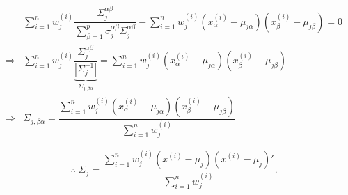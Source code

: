 \documentclass[11pt, a4paper]{article}
\begin{document}
\begin{align*}
&\sum_{i=1}^{n} w_j^{(i)} \dfrac{\Sigma_j^{\alpha\beta}}{\sum \limits_{\beta = 1}^{p} \sigma_j^{\alpha \beta}\Sigma_j^{\alpha \beta}} - \sum_{i=1}^{n} w_j^{(i)} \left(x_\alpha^{(i)}-\mu_{j\alpha}\right) \left(x_\beta^{(i)}-\mu_{j\beta}\right) = 0 \\[0.5em]
\Rightarrow &\sum_{i=1}^{n} w_j^{(i)} \underbrace{\dfrac{\Sigma_j^{\alpha\beta}}{|\Sigma_j^{-1}|}}_{\Sigma_{j, \beta \alpha}} = \sum_{i=1}^{n} w_j^{(i)} \left(x_\alpha^{(i)}-\mu_{j\alpha}\right) \left(x_\beta^{(i)}-\mu_{j\beta}\right) \\[0.5em]
\Rightarrow &\Sigma_{j, \beta \alpha} = \dfrac{\sum \limits_{i=1}^{n} w_j^{(i)} \left(x_\alpha^{(i)}-\mu_{j\alpha}\right) \left(x_\beta^{(i)}-\mu_{j\beta}\right)}{\sum \limits_{i=1}^{n} w_j^{(i)}}
\end{align*}

$$\boxed{\therefore \; \Sigma_j = \dfrac{\sum \limits_{i=1}^{n} w_j^{(i)} \left(x^{(i)}-\mu_{j}\right) \left(x^{(i)}-\mu_{j}\right)'}{\sum \limits_{i=1}^{n} w_j^{(i)}}.}$$
\end{document}
